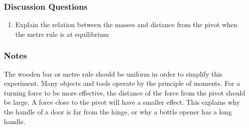 \subsubsection*{Discussion Questions}
\begin{enumerate}
\item{Explain the relation between the masses and distance from the pivot when the metre rule is at equilibrium}
\end{enumerate}

\subsubsection*{Notes}
The wooden bar or metre rule should be uniform in order to simplify this experiment.
Many objects and tools operate by the principle of moments.  For a turning force to be more effective, the distance of the force from the pivot should be large.  A force close to the pivot will have a smaller effect.  This explains why the handle of a door is far from the hinge, or why a bottle opener has a long handle.
